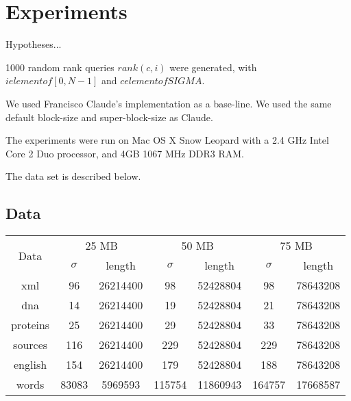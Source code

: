 \section{Experiments}

Hypotheses...

1000 random rank queries $rank(c, i)$ were generated, with $i elementof [0, N-1]$ and $c elementof SIGMA$.

We used Francisco Claude's
implementation as a base-line. We used the same default block-size and
super-block-size as Claude.

The experiments were run on Mac OS X Snow Leopard with a 2.4 GHz Intel Core 2
Duo processor, and 4GB 1067 MHz DDR3 RAM.

The data set is described below.

\subsection{Data}

\begin{center}
\begin{tabular}{ccccccc}
\toprule
\multirow{2}{*}{Data} & \multicolumn{2}{c}{25 MB} & \multicolumn{2}{c}{50 MB} &  
	\multicolumn{2}{c}{75 MB}\\
		  \cmidrule(r){2-7}
	      &$\sigma$& length   &$\sigma$& length   &$\sigma$& length \\
\midrule
xml 	  & 96	   & 26214400 & 98 	   & 52428804 & 98 	   & 78643208 \\
dna 	  & 14     & 26214400 & 19 	   & 52428804 & 21     & 78643208 \\
proteins  & 25     & 26214400 & 29     & 52428804 & 33     & 78643208 \\
sources   & 116    & 26214400 & 229    & 52428804 & 229    & 78643208 \\
english   & 154    & 26214400 & 179    & 52428804 & 188    & 78643208 \\
words     & 83083  & 5969593  & 115754 & 11860943 & 164757 & 17668587 \\
\bottomrule
\end{tabular}
\end{center}


